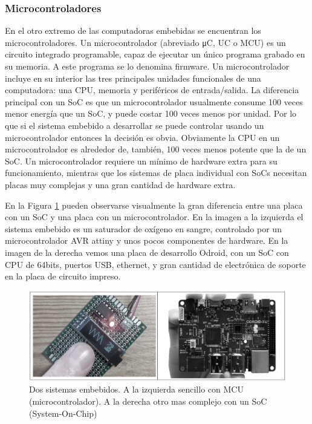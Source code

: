 \documentclass[output=paper, 
colorlinks,
citecolor=brown,
newtxmath
]{langscibook}
\begin{document}
\subsubsection*{Microcontroladores}
En el otro extremo de las computadoras embebidas se encuentran los
microcontroladores. Un microcontrolador (abreviado μC, UC o MCU) 
es un circuito integrado programable, capaz de ejecutar un único programa
grabado en su memoria. A este programa se lo denomina firmware.
Un microcontrolador incluye en su interior las tres principales 
unidades funcionales de una computadora: una CPU, 
memoria y periféricos de entrada/salida.
La diferencia principal con un SoC es que un microcontrolador usualmente
consume 100 veces menor energía que un SoC, y puede costar 100 veces
menos por unidad. Por lo que si el sistema embebido
a desarrollar se puede controlar usando un microcontrolador 
entonces la decisión es obvia. Obviamente la CPU en un microcontrolador
es alrededor de, también, 100 veces menos potente que la de un SoC.
Un microcontrolador 
requiere un mínimo de hardware extra para su funcionamiento, 
mientras que los sistemas de placa individual con SoCs
necesitan placas muy complejas y una gran cantidad de hardware extra.

En la Figura \ref{fig:microvssoc} pueden observarse visualmente
la gran diferencia entre una placa con un SoC y una placa
con un microcontrolador. En la imagen a la izquierda el sistema
embebido es un saturador de oxígeno en sangre, controlado
por un microcontrolador AVR attiny y unos pocos componentes de hardware.
En la imagen de la derecha vemos
una placa de desarrollo Odroid, con un SoC con CPU de 64bits,
puertos USB, ethernet, y gran cantidad de electrónica de soporte
en la placa de circuito impreso.

\begin{figure}
\includegraphics[scale=0.25]{images/microvssoc.png}
\caption{Dos sistemas embebidos. A la izquierda sencillo con MCU (microcontrolador). A la derecha otro mas complejo con un SoC (System-On-Chip)}
\label{fig:microvssoc}
\end{figure}
\end{document}
